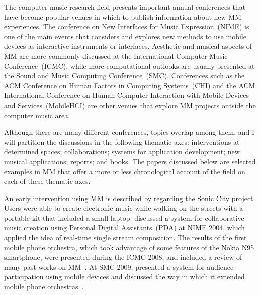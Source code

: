The computer music research field presents important annual conferences that have become popular venues in which to publish information about new MM experiences.
The conference on New Interfaces for Music Expression~(NIME) is one of the main events that considers and explores new methods to use mobile devices as interactive instruments or interfaces.
Aesthetic and musical aspects of MM are more commonly discussed at the International Computer Music Conference~(ICMC), while more computational outlooks are usually presented at the Sound and Music Computing Conference~(SMC).
Conferences such as the ACM Conference on Human Factors in Computing Systems~(CHI) and the ACM International Conference on Human-Computer Interaction with Mobile Devices and Services~(MobileHCI) are other venues that explore MM projects outside the computer music area.

Although there are many different conferences, topics overlap among them, and I will partition the discussions in the following thematic axes: interventions at determined spaces; collaborations; systems for application development; new musical applications; reports; and books.
The papers discussed below are selected examples in MM that offer a more or less chronological account of the field on each of these thematic axes.

An early intervention using MM is described by \cite{Gaye2003sonic} regarding the Sonic City project.
Users were able to create electronic music while walking on the streets with a portable kit that included a small laptop.
\cite{Tanaka2004mobile} discussed a system for collaborative music creation using Personal Digital Assistants~(PDA) at NIME 2004, which applied the idea of real-time single stream composition.
The results of the first mobile phone orchestra, which took advantage of some features of the Nokia N95 smartphone, were presented during the ICMC 2008, and included a review of many past works on MM~\citep{Wang2008domobilephones}.
At SMC 2009,  presented a system for audience participation using mobile devices and discussed the way in which it extended mobile phone orchestras~\citep{Tahiroglu2009towards}.

